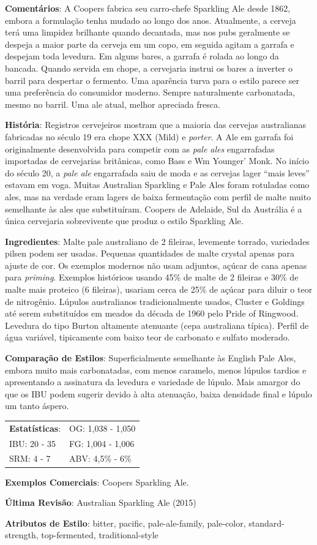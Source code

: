 \textbf{Comentários}: A Coopers fabrica seu carro-chefe Sparkling Ale desde 1862, embora a formulação tenha mudado ao longo dos anos. Atualmente, a cerveja terá uma limpidez brilhante quando decantada, mas nos pubs geralmente se despeja a maior parte da cerveja em um copo, em seguida agitam a garrafa e despejam toda levedura. Em alguns bares, a garrafa é rolada ao longo da bancada. Quando servida em chope, a cervejaria instrui os bares a inverter o barril para despertar o fermento. Uma aparência turva para o estilo parece ser uma preferência do consumidor moderno. Sempre naturalmente carbonatada, mesmo no barril. Uma ale atual, melhor apreciada fresca.

\textbf{História}: Registros cervejeiros mostram que a maioria das cervejas australianas fabricadas no século 19 era chope XXX (Mild) e \textit{porter}. A Ale em garrafa foi originalmente desenvolvida para competir com as \textit{pale ales} engarrafadas importadas de cervejarias britânicas, como Bass e Wm Younger' Monk. No início do século 20, a \textit{pale ale} engarrafada saiu de moda e as cervejas lager “mais leves” estavam em voga. Muitas Australian Sparkling e Pale Ales foram rotuladas como ales, mas na verdade eram lagers de baixa fermentação com perfil de malte muito semelhante às ales que substituíram. Coopers de Adelaide, Sul da Austrália é a única cervejaria sobrevivente que produz o estilo Sparkling Ale.

\textbf{Ingredientes}: Malte pale australiano de 2 fileiras, levemente torrado, variedades pilsen podem ser usadas. Pequenas quantidades de malte crystal apenas para ajuste de cor. Os exemplos modernos não usam adjuntos, açúcar de cana apenas para \textit{priming}. Exemplos históricos usando 45\% de malte de 2 fileiras e 30\% de malte mais proteico (6 fileiras), usariam cerca de 25\% de açúcar para diluir o teor de nitrogênio. Lúpulos australianos tradicionalmente usados, Cluster e Goldings até serem substituídos em meados da década de 1960 pelo Pride of Ringwood. Levedura do tipo Burton altamente atenuante (cepa australiana típica). Perfil de água variável, tipicamente com baixo teor de carbonato e sulfato moderado.

\textbf{Comparação de Estilos}: Superficialmente semelhante às English Pale Ales, embora muito mais carbonatadas, com menos caramelo, menos lúpulos tardios e apresentando a assinatura da levedura e variedade de lúpulo. Mais amargor do que os IBU podem sugerir devido à alta atenuação, baixa densidade final e lúpulo um tanto áspero.

\begin{tabular}{@{}p{35mm}p{35mm}@{}}
  \textbf{Estatísticas}: & OG: 1,038 - 1,050 \\
  IBU: 20 - 35  & FG: 1,004 - 1,006 \\
  SRM: 4 - 7  & ABV: 4,5\% - 6\%
\end{tabular}

\textbf{Exemplos Comerciais}: Coopers Sparkling Ale.

\textbf{Última Revisão}: Australian Sparkling Ale (2015)

\textbf{Atributos de Estilo}: bitter, pacific, pale-ale-family, pale-color, standard-strength, top-fermented, traditional-style
